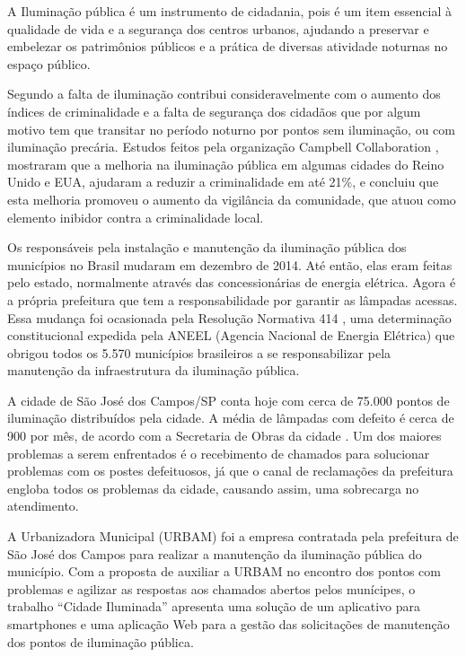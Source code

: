 \documentclass[
	article,			%
	11pt,				%
	oneside,			%
	a4paper,			%
	english,			%
	brazil,				%
	sumario=tradicional
	]{abntex2}
\begin{document}
A Iluminação pública é um instrumento de cidadania, pois é um item essencial à qualidade de vida e a segurança dos centros urbanos, ajudando a preservar e embelezar os patrimônios públicos e a prática de diversas atividade noturnas
no espaço público.

Segundo \cite{aver} a falta de iluminação contribui consideravelmente com o aumento dos índices de criminalidade e a falta de segurança dos cidadãos que por algum motivo tem que transitar no período noturno por pontos sem iluminação, ou com iluminação precária.
Estudos feitos pela organização Campbell Collaboration \cite{newton}, mostraram que a melhoria na iluminação pública em algumas cidades do Reino Unido e EUA, ajudaram a reduzir a criminalidade em até 21\%, e concluiu que esta melhoria promoveu o aumento da vigilância da comunidade, que atuou como elemento inibidor contra a criminalidade local.

Os responsáveis pela instalação e manutenção da iluminação pública dos municípios no Brasil mudaram em dezembro de 2014.
Até então, elas eram feitas pelo estado, normalmente através das concessionárias de energia elétrica.
Agora é a própria prefeitura que tem a responsabilidade por garantir as lâmpadas acessas.
Essa mudança foi ocasionada pela Resolução Normativa 414 \cite{aneel414}, uma determinação constitucional expedida pela ANEEL (Agencia Nacional de Energia Elétrica) que obrigou todos os 5.570 municípios brasileiros a se responsabilizar pela manutenção da infraestrutura da iluminação pública.

A cidade de São José dos Campos/SP conta hoje com cerca de 75.000 pontos de iluminação distribuídos pela cidade.
A média de lâmpadas com defeito é cerca de 900 por mês, de acordo com a Secretaria de Obras da cidade \cite{secretariaobras}.
Um dos maiores problemas a serem enfrentados é o recebimento de chamados para solucionar problemas com os postes defeituosos, já que o canal de reclamações da prefeitura engloba todos os problemas da cidade, causando assim, uma sobrecarga no atendimento.

A Urbanizadora Municipal (URBAM) foi a empresa contratada pela prefeitura de São José dos Campos para realizar a manutenção da iluminação pública do município.
Com a proposta de auxiliar a URBAM no encontro dos pontos com problemas e agilizar as respostas aos chamados abertos pelos munícipes, o trabalho “Cidade Iluminada” apresenta uma solução de um aplicativo para smartphones e uma aplicação Web para a gestão das solicitações de manutenção dos pontos de iluminação pública.
\end{document}
